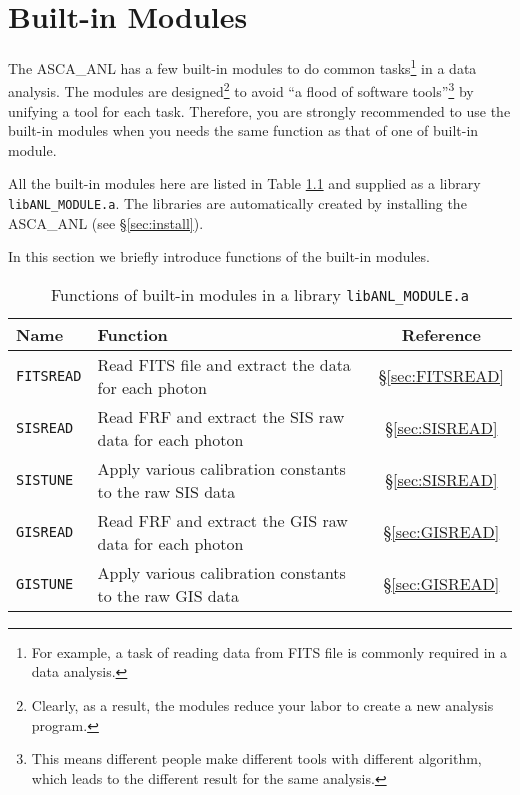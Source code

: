 \chapter{Built-in Modules}
The ASCA\_ANL has a few built-in modules to do common tasks\footnote{
For example,
a task of reading data from FITS file is commonly required in a data analysis.
}
in a data analysis.
The modules are designed\footnote{
Clearly,
as a result,
the modules reduce your labor to create a new analysis program.
}
to avoid ``a flood of software tools''\footnote{
This means different people make different tools with different algorithm,
which leads to the different result for the same analysis.
}
by unifying a tool for each task.
Therefore,
you are strongly recommended to use the built-in modules
when you needs the same function as that of one of built-in module.

All the built-in modules here are 
listed in Table \ref{tab:built-in}
and supplied as a library {\tt libANL\_MODULE.a}.
The libraries are automatically created by installing the ASCA\_ANL
(see \S \ref{sec:install}).

In this section
we briefly introduce functions of the built-in modules.

\begin{table}[htb]
\begin{minipage}{\textwidth}
\begin{center}
\begin{tabular}{|l|l|c|}
\hline
Name & Function & Reference \\ \hline
{\tt FITSREAD}
	& Read FITS file and extract the data for each photon
	& \S\ref{sec:FITSREAD} \\
{\tt SISREAD}
	& Read FRF and extract the SIS raw data for each photon
	& \S\ref{sec:SISREAD} \\
{\tt SISTUNE}
	& Apply various calibration constants to the raw SIS data
	& \S\ref{sec:SISREAD} \\
{\tt GISREAD}
	& Read FRF and extract the GIS raw data for each photon
	& \S\ref{sec:GISREAD} \\
{\tt GISTUNE}
	& Apply various calibration constants to the raw GIS data
	& \S\ref{sec:GISREAD} \\ \hline
\end{tabular}
\end{center}
\end{minipage}
\caption{Functions of built-in modules in a library {\tt libANL\_MODULE.a}}
\label{tab:built-in}
\end{table}

